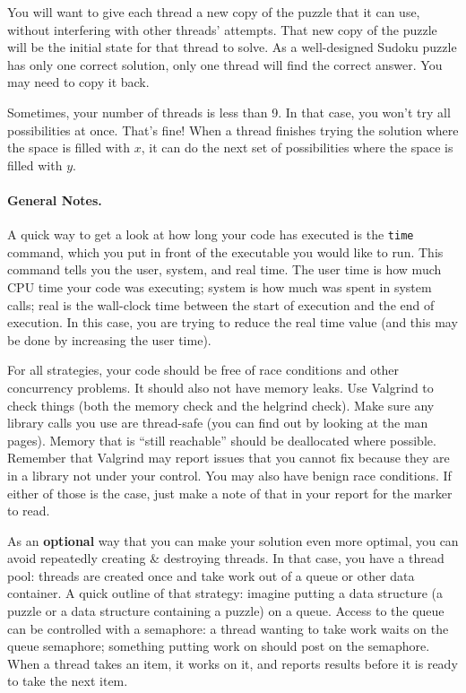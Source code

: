 \documentclass[letterpaper,10pt]{article}
\begin{document}
You will want to give each thread a new copy of
the puzzle that it can use,
without interfering with other threads' attempts. That new copy of the 
puzzle will be the initial state for that thread to solve.
As a well-designed Sudoku puzzle has only one 
correct solution, only one thread will find the correct answer.
You may need to copy it back.

Sometimes, your number of threads is less than 9. In that case,
you won't try all possibilities at once. That's fine! When a thread finishes
trying the solution where the space is filled with $x$, it can do the 
next set of possibilities where the space is filled with $y$.






\paragraph{General Notes.}
A quick way to get a look at how long your code has executed is the 
\texttt{time} command, which you put in front of the executable you would
like to run. This command tells you the user, system, and real time. The
user time is how much CPU time your code was executing; system is how much
was spent in system calls; real is the wall-clock time between the start of
execution and the end of execution. In this case, you are trying to reduce
the real time value (and this may be done by increasing the user time).


For all strategies, your code should be free of race conditions and other
concurrency problems. It should also not have memory leaks. Use Valgrind
to check things (both the memory check and the helgrind check). 
Make sure any library calls you use are thread-safe (you
can find out by looking at the man pages). Memory that is ``still reachable'' 
should be deallocated where possible. Remember that Valgrind may report
issues that you cannot fix because they are in a library not under your
control. You may also have benign race conditions. If either of those 
is the case, just make a note of that in your report for the marker to read.

As an \textbf{optional} way that you can make your solution even more optimal, 
you can avoid repeatedly creating \& destroying threads.
In that case, you have 
a thread pool: threads are created once and take work out of a queue or other 
data container. A quick outline of that strategy: imagine putting a data 
structure (a puzzle or a data structure containing a puzzle) on a queue. 
Access to the queue can be controlled with a semaphore: a thread wanting to 
take work waits on the queue semaphore; something putting work on should post 
on the semaphore. When a thread takes an item, it works on it, and reports
results before it is ready to take the next item.
\end{document}
